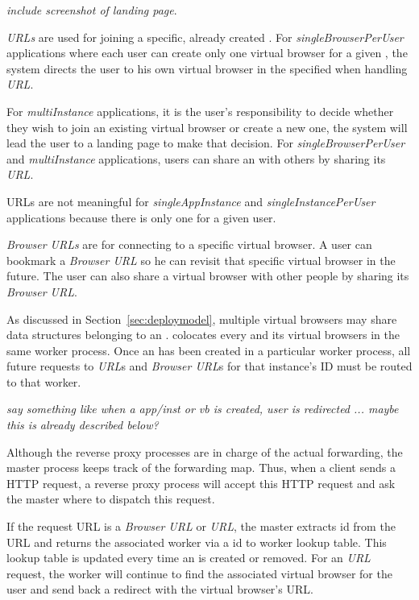 \emph{include screenshot of landing page}.

\emph{\appins{} URLs} are used for joining a specific, already created \appins{}.  
For \emph{singleBrowserPerUser} applications where each user
can create only  one virtual browser for a given \appins{}, the system directs
the user to his own virtual browser in the specified \appins{} when handling
\emph{\appins{} URL}. 

For \emph{multiInstance} applications, it is the user's responsibility
to decide whether they wish to join an existing virtual browser or create a new one,
the system will lead the user to a landing page to make that decision.
For \emph{singleBrowserPerUser} and \emph{multiInstance} applications,
users can share an \appins{} with others by sharing its \emph{\appins{} URL}.

\appins{} URLs are not meaningful for \emph{singleAppInstance}   and
\emph{singleInstancePerUser} applications because there is only one \appins{}
for a given user. 

\emph{Browser URLs} are for connecting to a specific virtual browser. A user can
bookmark a \emph{Browser URL} so he can revisit that specific  virtual browser
in the future. The user can also share a virtual browser with other people by
sharing its \emph{Browser URL}.

As discussed in Section~\ref{sec:deploymodel}, multiple virtual browsers
may share data structures belonging to an \appins{}.
\cbtwo colocates every \appins and its virtual browsers in the same worker process.
Once an \appins has been created in a particular worker process, all future
requests to \emph{\appins{} URL}s and \emph{Browser URL}s for that instance's
ID must be routed to that worker.

\emph{ say something like when a app/inst or vb is created, user is redirected
... maybe this is already described below?}


Although the reverse proxy processes are in charge of the actual forwarding,
the master process keeps track of the forwarding map. Thus,
when a client sends a HTTP request, a reverse proxy process
will accept this HTTP request and ask the master where to dispatch this request. 

If the request URL is a \emph{Browser URL} or \emph{\appins URL}, 
the master extracts \appins id from the URL and returns the associated
worker via a \appins id to worker lookup table.
This lookup table is updated every time an \appins{} is created or removed.
For an \emph{\appins URL} request, the worker will continue to find the associated
virtual browser for the user and send back a redirect with the virtual browser's URL.

